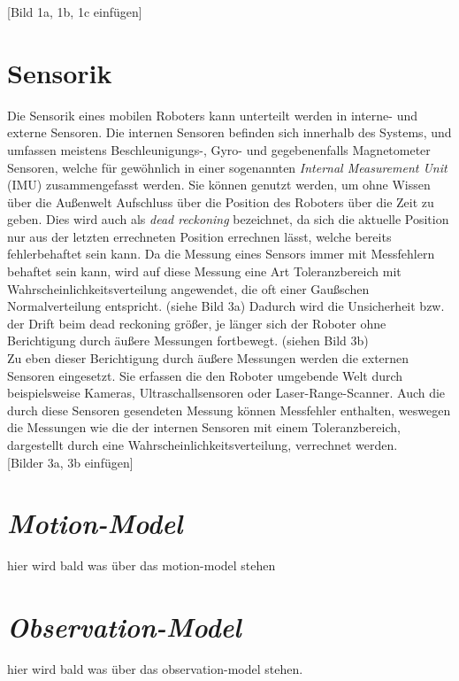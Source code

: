 [Bild 1a, 1b, 1c einfügen]




\section{Sensorik}\label{sec:Sensorik}
Die Sensorik eines mobilen Roboters kann unterteilt werden in interne- und externe Sensoren. Die internen Sensoren befinden sich innerhalb des Systems, und umfassen meistens Beschleunigungs-, Gyro- und gegebenenfalls Magnetometer Sensoren, welche für gewöhnlich in einer sogenannten \textit{Internal Measurement Unit} (IMU) zusammengefasst werden. Sie können genutzt werden, um ohne Wissen über die Außenwelt Aufschluss über die Position des Roboters über die Zeit zu geben. Dies wird auch als \textit{dead reckoning} bezeichnet, da sich die aktuelle Position nur aus der letzten errechneten Position errechnen lässt, welche bereits fehlerbehaftet sein kann. Da die Messung eines Sensors immer mit Messfehlern behaftet sein kann, wird auf diese Messung eine Art Toleranzbereich mit Wahrscheinlichkeitsverteilung angewendet, die oft einer Gaußschen Normalverteilung entspricht. (siehe Bild 3a) Dadurch wird die Unsicherheit bzw. der Drift beim dead reckoning größer, je länger sich der Roboter ohne Berichtigung durch äußere Messungen fortbewegt. (siehen Bild 3b)\\
Zu eben dieser Berichtigung durch äußere Messungen werden die externen Sensoren eingesetzt. Sie erfassen die den Roboter umgebende Welt durch beispielsweise Kameras, Ultraschallsensoren oder Laser-Range-Scanner. Auch die durch diese Sensoren gesendeten Messung können Messfehler enthalten, weswegen die Messungen wie die der internen Sensoren mit einem Toleranzbereich, dargestellt durch eine Wahrscheinlichkeitsverteilung, verrechnet werden.\\

[Bilder 3a, 3b einfügen]

\section{\textit{Motion-Model}}\label{sec:Motion-Model}
hier wird bald was über das motion-model stehen

\section{\textit{Observation-Model}}\label{sec:Observation-Model}
hier wird bald was über das observation-model stehen.



